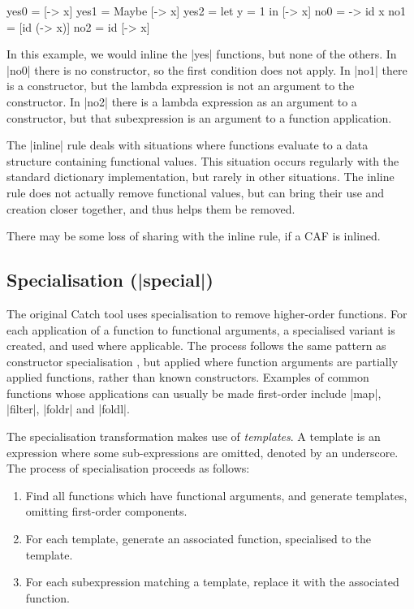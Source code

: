\documentclass[preprint]{sigplanconf}
\begin{document}
\begin{example}
\begin{code}
yes0 = [\x -> x]
yes1 = Maybe [\x -> x]
yes2 = let y = 1 in [\x -> x]
no0 = \x -> id x
no1 = [id (\x -> x)]
no2 = id [\x -> x]
\end{code}

In this example, we would inline the |yes| functions, but none of the others. In |no0| there is no constructor, so the first condition does not apply. In |no1| there is a constructor, but the lambda expression is not an argument to the constructor. In |no2| there is a lambda expression as an argument to a constructor, but that subexpression is an argument to a function application.
\end{example}

The |inline| rule deals with situations where functions evaluate to a data structure containing functional values. This situation occurs regularly with the standard dictionary implementation, but rarely in other situations. The inline rule does not actually remove functional values, but can bring their use and creation closer together, and thus helps them be removed.

There may be some loss of sharing with the inline rule, if a CAF is inlined.

\subsection{Specialisation (|special|)}

The original Catch tool \cite{me:catch_tfp} uses specialisation to remove higher-order functions. For each application of a function to functional arguments, a specialised variant is created, and used where applicable. The process follows the same pattern as constructor specialisation \cite{spj:specconstr}, but applied where function arguments are partially applied functions, rather than known constructors. Examples of common functions whose applications can usually be made first-order include |map|, |filter|, |foldr| and |foldl|.

The specialisation transformation makes use of \textit{templates}. A template is an expression where some sub-expressions are omitted, denoted by an underscore. The process of specialisation proceeds as follows:

\begin{enumerate}
\item Find all functions which have functional arguments, and generate templates, omitting first-order components.
\item For each template, generate an associated function, specialised to the template.
\item For each subexpression matching a template, replace it with the associated function.
\end{enumerate}
\end{document}
